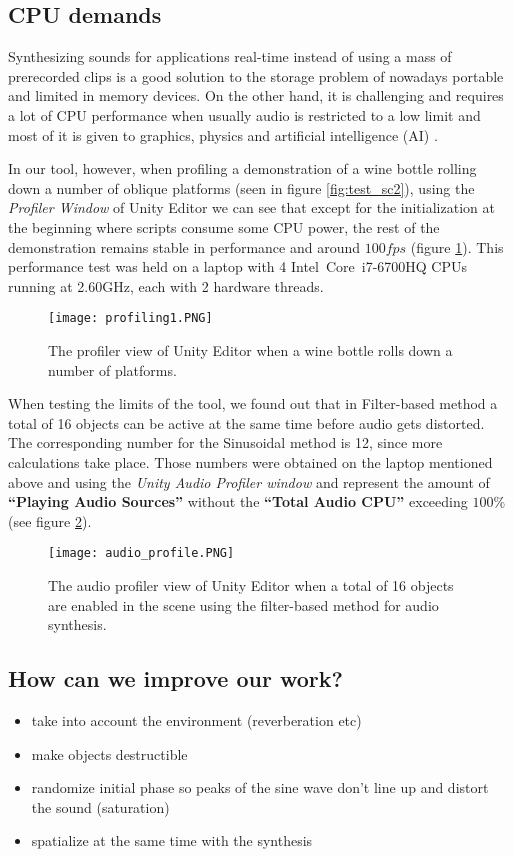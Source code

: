 \subsection{CPU demands}
Synthesizing sounds for applications real-time instead of using a mass of prerecorded clips is a good solution to the storage problem of nowadays portable and limited in memory devices. On the other hand, it is challenging and requires a lot of CPU performance when usually audio is restricted to a low limit and most of it is given to graphics, physics and artificial intelligence (AI) \cite{lloyd2011sound}. 

In our tool, however, when profiling a demonstration of a wine bottle rolling down a number of oblique platforms (seen in figure \ref{fig:test_sc2}), using the \textit{Profiler Window} of Unity Editor we can see that except for the initialization at the beginning where scripts consume some CPU power, the rest of the demonstration remains stable in performance and around $100 fps$ (figure \ref{fig:profile}). This performance test was held on a laptop with 4 Intel\textregistered\ Core\texttrademark\ i7-6700HQ CPUs running at 2.60GHz, each with 2 hardware threads.

\begin{figure}[H]
  \centering
    \texttt{[image: profiling1.PNG]}
      \caption{The profiler view of Unity Editor when a wine bottle rolls down a number of platforms.}
      \label{fig:profile}
\end{figure} 

When testing the limits of the tool, we found out that in Filter-based method a total of 16 objects can be active at the same time before audio gets distorted. The corresponding number for the Sinusoidal method is 12, since more calculations take place. Those numbers were obtained on the laptop mentioned above and using the \textit{Unity Audio Profiler window} and represent the amount of \textbf{``Playing Audio Sources''} without the \textbf{``Total Audio CPU''} exceeding $100\%$ (see figure \ref{fig:audio_profile}).

\begin{figure}[H]
  \centering
    \texttt{[image: audio\_profile.PNG]}
      \caption{The audio profiler view of Unity Editor when a total of 16 objects are enabled in the scene using the filter-based method for audio synthesis.}
      \label{fig:audio_profile}
\end{figure}

\subsection{How can we improve our work?}
\begin{itemize}
\item take into account the environment (reverberation etc)
\item make objects destructible
\item randomize initial phase so peaks of the sine wave don't line up and distort the sound (saturation)
\item spatialize at the same time with the synthesis
\end{itemize}

